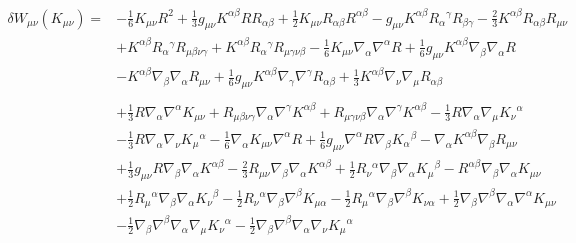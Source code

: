 \documentclass[10pt,letterpaper]{article}
\begin{document}
\begin{align}
\delta W_{\mu\nu}(K_{\mu\nu})={}&- \tfrac{1}{6} K_{\mu \nu} R^2
 + \tfrac{1}{3} g_{\mu \nu} K^{\alpha \beta} R R_{\alpha \beta}
 + \tfrac{1}{2} K_{\mu \nu} R_{\alpha \beta} R^{\alpha \beta}
 -  g_{\mu \nu} K^{\alpha \beta} R_{\alpha}{}^{\gamma} R_{\beta \gamma}
 -  \tfrac{2}{3} K^{\alpha \beta} R_{\alpha \beta} R_{\mu \nu}\nonumber\\
& + K^{\alpha \beta} R_{\alpha}{}^{\gamma} R_{\mu \beta \nu \gamma}
 + K^{\alpha \beta} R_{\alpha}{}^{\gamma} R_{\mu \gamma \nu \beta}
 -  \tfrac{1}{6} K_{\mu \nu} \nabla_{\alpha}\nabla^{\alpha}R
 + \tfrac{1}{6} g_{\mu \nu} K^{\alpha \beta} \nabla_{\beta}\nabla_{\alpha}R\nonumber\\
& -  K^{\alpha \beta} \nabla_{\beta}\nabla_{\alpha}R_{\mu \nu}
 + \tfrac{1}{6} g_{\mu \nu} K^{\alpha \beta} \nabla_{\gamma}\nabla^{\gamma}R_{\alpha \beta}
 + \tfrac{1}{3} K^{\alpha \beta} \nabla_{\nu}\nabla_{\mu}R_{\alpha \beta}\nonumber \\
\nonumber \\
&+\tfrac{1}{3} R \nabla_{\alpha}\nabla^{\alpha}K_{\mu \nu}
 + R_{\mu \beta \nu \gamma} \nabla_{\alpha}\nabla^{\gamma}K^{\alpha \beta}
 + R_{\mu \gamma \nu \beta} \nabla_{\alpha}\nabla^{\gamma}K^{\alpha \beta}
 -  \tfrac{1}{3} R \nabla_{\alpha}\nabla_{\mu}K_{\nu}{}^{\alpha}\nonumber\\
& -  \tfrac{1}{3} R \nabla_{\alpha}\nabla_{\nu}K_{\mu}{}^{\alpha}
 -  \tfrac{1}{6} \nabla_{\alpha}K_{\mu \nu} \nabla^{\alpha}R
 + \tfrac{1}{6} g_{\mu \nu} \nabla^{\alpha}R \nabla_{\beta}K_{\alpha}{}^{\beta}
 -  \nabla_{\alpha}K^{\alpha \beta} \nabla_{\beta}R_{\mu \nu}\nonumber\\
& + \tfrac{1}{3} g_{\mu \nu} R \nabla_{\beta}\nabla_{\alpha}K^{\alpha \beta}
 -  \tfrac{2}{3} R_{\mu \nu} \nabla_{\beta}\nabla_{\alpha}K^{\alpha \beta}
 + \tfrac{1}{2} R_{\nu}{}^{\alpha} \nabla_{\beta}\nabla_{\alpha}K_{\mu}{}^{\beta}
 -  R^{\alpha \beta} \nabla_{\beta}\nabla_{\alpha}K_{\mu \nu}\nonumber\\
& + \tfrac{1}{2} R_{\mu}{}^{\alpha} \nabla_{\beta}\nabla_{\alpha}K_{\nu}{}^{\beta}
 -  \tfrac{1}{2} R_{\nu}{}^{\alpha} \nabla_{\beta}\nabla^{\beta}K_{\mu \alpha}
 -  \tfrac{1}{2} R_{\mu}{}^{\alpha} \nabla_{\beta}\nabla^{\beta}K_{\nu \alpha}
 + \tfrac{1}{2} \nabla_{\beta}\nabla^{\beta}\nabla_{\alpha}\nabla^{\alpha}K_{\mu \nu}\nonumber\\
& -  \tfrac{1}{2} \nabla_{\beta}\nabla^{\beta}\nabla_{\alpha}\nabla_{\mu}K_{\nu}{}^{\alpha}
 -  \tfrac{1}{2} \nabla_{\beta}\nabla^{\beta}\nabla_{\alpha}\nabla_{\nu}K_{\mu}{}^{\alpha}

\end{align}
\end{document}
